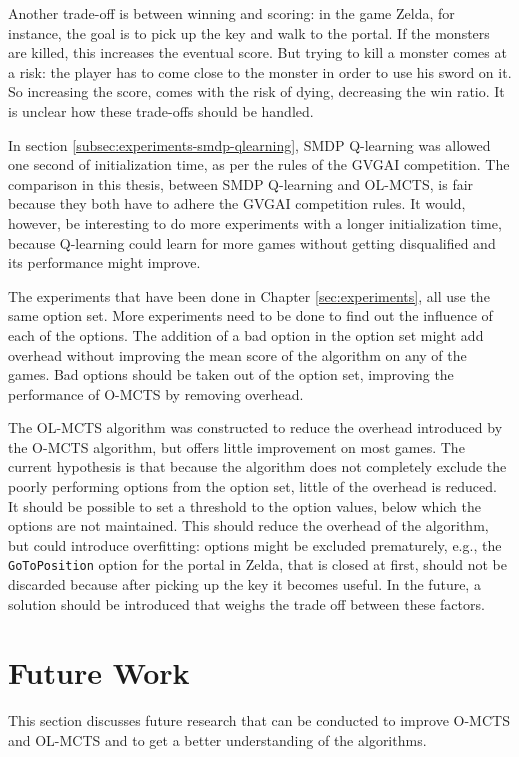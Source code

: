 Another trade-off is between winning and scoring: in the game Zelda, for
instance, the goal is to pick up the key and walk to the portal. If the monsters
are killed, this increases the eventual score. But trying to kill a monster
comes at a risk: the player has to come close to the monster in order to use his
sword on it. So increasing the score, comes with the risk of dying, decreasing
the win ratio. It is unclear how these trade-offs should be handled.

In section \ref{subsec:experiments-smdp-qlearning}, SMDP Q-learning was allowed
one second of initialization time, as per the rules of the GVGAI competition.
The comparison in this thesis, between SMDP Q-learning and OL-MCTS, is fair
because they both have to adhere the GVGAI competition rules. It would, however,
be interesting to do more experiments with a longer initialization time, because
Q-learning could learn for more games without getting disqualified and its
performance might improve.

The experiments that have been done in Chapter \ref{sec:experiments}, all use
the same option set. More experiments need to be done to find out the influence
of each of the options. The addition of a bad option in the option set might add
overhead without improving the mean score of the algorithm on any of the games.
Bad options should be taken out of the option set, improving the performance of
O-MCTS by removing overhead. 

The OL-MCTS algorithm was constructed to reduce the overhead introduced by the
O-MCTS algorithm, but offers little improvement on most games. The current
hypothesis is that because the algorithm does not completely exclude the poorly
performing options from the option set, little of the overhead is reduced. It
should be possible to set a threshold to the option values, below which the
options are not maintained. This should reduce the overhead of the algorithm,
but could introduce overfitting: options might be excluded prematurely, 
e.g., the \texttt{GoToPosition} option for the portal in Zelda, that is closed
at first, should not be discarded because after picking up the key it becomes
useful. In the future, a solution should be introduced that weighs the trade off
between these factors.


\section{Future Work}
This section discusses future research that can be conducted to improve O-MCTS
and OL-MCTS and to get a better understanding of the algorithms. 

